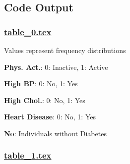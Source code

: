 \documentclass[11pt]{article}
\begin{document}
\subsection{Code Output}

\subsubsection*{\hyperlink{code-LaTeX Table Design-table-0-tex}{table\_0.tex}}

\begin{codeoutput}
\begin{table}[h]
\caption{Descriptive statistics of Physical Activity and Chronic Health Conditions stratified by Diabetes status}
\label{table:descriptive_statistics}
\begin{threeparttable}
\renewcommand{\TPTminimum}{\linewidth}
\begin{tablenotes}
\footnotesize
\item Values represent frequency distributions
\item \textbf{Phys. Act.}: 0: Inactive, 1: Active
\item \textbf{High BP}: 0: No, 1: Yes
\item \textbf{High Chol.}: 0: No, 1: Yes
\item \textbf{Heart Disease}: 0: No, 1: Yes
\item \textbf{No}: Individuals without Diabetes
\end{tablenotes}
\end{threeparttable}
\end{table}

\end{codeoutput}

\subsubsection*{\hyperlink{code-LaTeX Table Design-table-1-tex}{table\_1.tex}}
\end{document}
